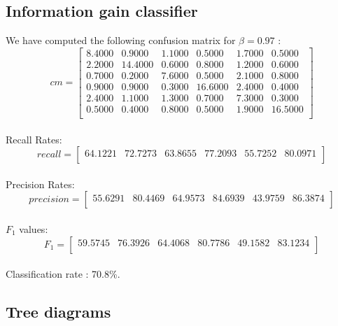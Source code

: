 \documentclass[a4paper,12pt,oneside,final]{report}
\begin{document}
\begin{appendices}
\subsection{Information gain classifier}
We have computed the following confusion matrix for $\beta=0.97$ :
\[
cm = \left[\begin{array}{cccccc}
    8.4000  &  0.9000  &  1.1000  &  0.5000  &  1.7000  &  0.5000 \\
    2.2000  & 14.4000  &  0.6000  &  0.8000  &  1.2000  &  0.6000 \\
    0.7000  &  0.2000  &  7.6000  &  0.5000  &  2.1000  &  0.8000 \\
    0.9000  &  0.9000  &  0.3000  & 16.6000  &  2.4000  &  0.4000 \\
    2.4000  &  1.1000  &  1.3000  &  0.7000  &  7.3000  &  0.3000 \\
    0.5000  &  0.4000  &  0.8000  &  0.5000  &  1.9000  & 16.5000 \\
\end{array}
\right]
\]
\paragraph{}
Recall Rates:
\[
recall = \left[\begin{array}{cccccc}
 64.1221 &  72.7273 &  63.8655 &  77.2093 &  55.7252 &  80.0971\\
\end{array}
\right]
\]
\paragraph{}
Precision Rates:
\[
precision = \left[\begin{array}{cccccc}
55.6291  & 80.4469 &  64.9573  & 84.6939 &  43.9759 &  86.3874 \\
\end{array}
\right]
\]
\paragraph{}
$F_{1}$ values: 
\[
F_{1} = \left[\begin{array}{cccccc}
59.5745  & 76.3926  & 64.4068  & 80.7786 &  49.1582 &  83.1234 \\
\end{array}
\right]
\]
\paragraph{}
Classification rate : 70.8\%.
\subsection{Tree diagrams}

\end{appendices}
\end{document}
